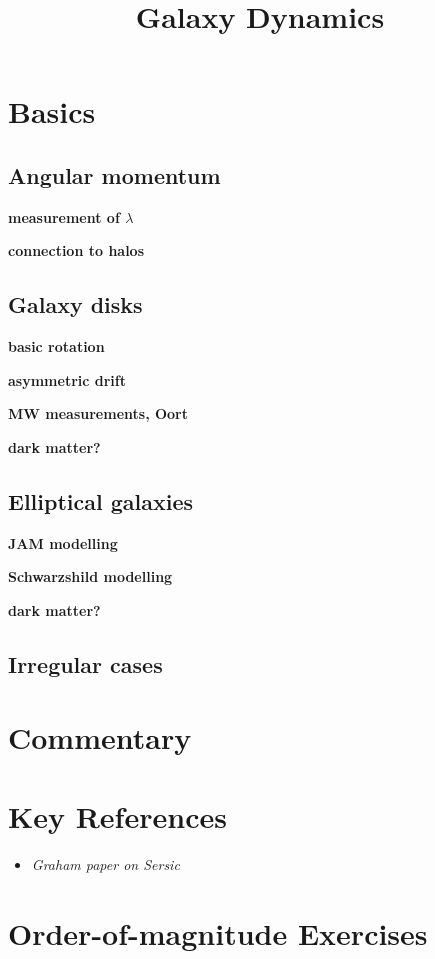 \title{\bf Galaxy Dynamics}

\section{Basics}

\subsection{Angular momentum}

{\bf measurement of $\lambda$}

{\bf connection to halos}

\subsection{Galaxy disks}

{\bf basic rotation}

{\bf asymmetric drift}

{\bf MW measurements, Oort}

{\bf dark matter?}

\subsection{Elliptical galaxies}

{\bf JAM modelling}

{\bf Schwarzshild modelling}

{\bf dark matter?}

\subsection{Irregular cases}

\section{Commentary}

\section{Key References}

\begin{itemize}
  \item
    {\it Graham paper on Sersic}
\end{itemize}

\citet{gunn06a}

\section{Order-of-magnitude Exercises}

